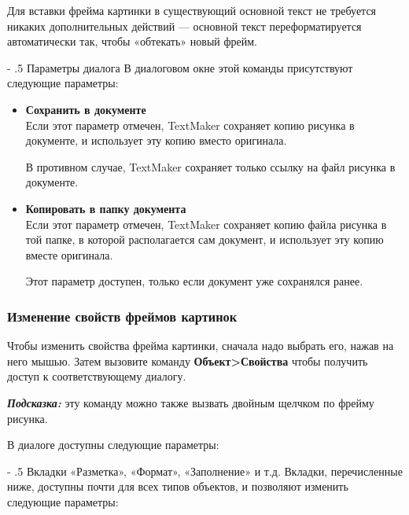 ﻿\documentclass[a4paper,10pt]{article}
\makeatletter
\renewcommand\paragraph{%
   \@startsection{paragraph}{4}{0mm}%
      {-\baselineskip}%
      {.5\baselineskip}%
      {\normalfont\normalsize\bfseries}}
\makeatother
\begin{document}
Для вставки фрейма картинки в существующий основной текст не требуется никаких дополнительных действий — основной текст переформатируется автоматически так, чтобы «обтекать» новый фрейм.

\paragraph{Параметры диалога}
В диалоговом окне этой команды присутствуют следующие параметры:
\begin{itemize}
 \item \textbf{Сохранить в документе}\\
 Если этот параметр отмечен, TextMaker сохраняет копию рисунка в документе, и использует эту копию вместо оригинала.
 
В противном случае, TextMaker сохраняет только ссылку на файл рисунка в документе.
\item \textbf{Копировать в папку документа}\\
Если этот параметр отмечен, TextMaker сохраняет копию файла рисунка в той папке, в которой располагается сам документ, и использует эту копию вместе оригинала.

Этот параметр доступен, только если документ уже сохранялся ранее.
\end{itemize}

\subsubsection{Изменение свойств фреймов картинок}
Чтобы изменить свойства фрейма картинки, сначала надо выбрать его, нажав на него мышью. Затем вызовите команду \textbf{Объект>Свойства} чтобы получить доступ к соответствующему диалогу.

\begin{mdframed}[backgroundcolor=blue!10]
\textbf{\textit{Подсказка:}} эту команду можно также вызвать двойным щелчком по фрейму рисунка.
\end{mdframed}

В диалоге доступны следующие параметры:

\paragraph{Вкладки «Разметка», «Формат», «Заполнение» и т.д.}
Вкладки, перечисленные ниже, доступны почти для всех типов объектов, и позволяют изменить следующие
параметры:
\end{document}
